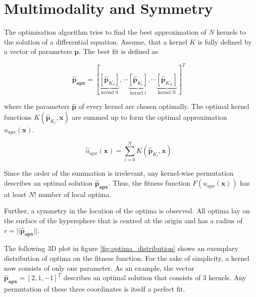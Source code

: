 \documentclass[./\jobname.tex]{subfiles}
\begin{document}
\section{Multimodality and Symmetry}
\label{chap:multimodality_and_symmetry}

The optimisation algorithm tries to find the best approximation of $N$ kernels to the solution of a differential equation. Assume, that a kernel $K$ is fully defined by a vector of parameters $\mathbf{p}$. The best fit is defined as 

\begin{equation}
\mathbf{\hat{p}_{apx}} = \left[\underbrace{\left[ \mathbf{\hat{p}}_{K_0} \right] }_{\text{kernel 0}}, \cdots \underbrace{\left[ \mathbf{\hat{p}}_{K_i} \right] }_{\text{kernel i}}, \cdots \underbrace{\left[ \mathbf{\hat{p}}_{K_N} \right]}_{\text{kernel N}} \right]^T
\end{equation}

where the parameters $\mathbf{\hat{p}}$ of every kernel are chosen optimally. The optimal kernel functions $K(\mathbf{\hat{p}}_{K_i}, \mathbf{x})$ are summed up to form the optimal approximation $\hat{u}_{apx}(\mathbf{x})$. 

\begin{equation}
\label{eq:uapx_kernel_sum}
\hat{u}_{apx}(\mathbf{x}) = \sum_{i=0}^{N} K(\mathbf{\hat{p}}_{K_i}, \mathbf{x})
\end{equation}

Since the order of the summation is irrelevant, any kernel-wise permutation describes an optimal solution $\mathbf{\hat{p}_{apx}}$. Thus, the fitness function $F(u_{apx}(\mathbf{x}))$ has at least $N!$ number of local optima. 

Further, a symmetry in the location of the optima is observed. All optima lay on the surface of the hypersphere that is centred at the origin and has a radius of $r = || \mathbf{\hat{p}_{apx}} ||$. 

The following 3D plot in figure \ref{fig:optima_distribution} shows an exemplary distribution of optima on the fitness function. For the sake of simplicity, a kernel now consists of only one parameter. As an example, the vector $\mathbf{\hat{p}_{apx}} = \left[ 2, 1, -1 \right]^T$ describes an optimal solution that consists of 3 kernels. Any permutation of these three coordinates is itself a perfect fit. 
\end{document}
